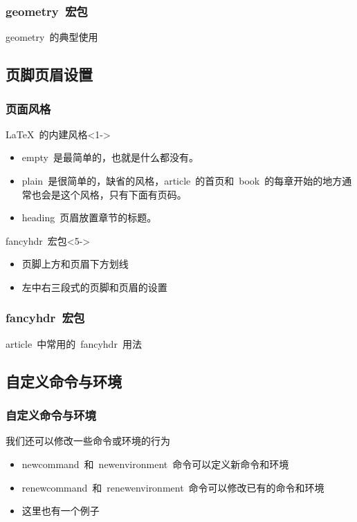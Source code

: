\begin{frame}
	\frametitle{geometry~宏包}
	\begin{block}{geometry~的典型使用}
		
	\end{block}
\end{frame}

\subsection{页脚页眉设置}

\begin{frame}
	\frametitle{页面风格}
	\begin{block}{\LaTeX~的内建风格}<1->
		\begin{itemize}
			\item<alert@2> \alert{empty}~是最简单的，也就是什么都没有。
			\item<alert@3> \alert{plain}~是很简单的，缺省的风格，article~的首页和~book~的每章开始的地方通常也会是这个风格，只有下面有页码。
			\item<alert@4> \alert{heading}~页眉放置章节的标题。
		\end{itemize}
	\end{block}
	\begin{block}{\alert{fancyhdr}~宏包}<5->
		\begin{itemize}
			\item 页脚上方和页眉下方划线
			\item 左中右三段式的页脚和页眉的设置
		\end{itemize}
	\end{block}
\end{frame}

\begin{frame}
	\frametitle{fancyhdr~宏包}
	\begin{block}{\alert{article}~中常用的~fancyhdr~用法}
		
	\end{block}
\end{frame}

\subsection{自定义命令与环境}
\begin{frame}
	\frametitle{自定义命令与环境}
	\begin{block}{我们还可以修改一些命令或环境的行为}
		\begin{itemize}
			\item newcommand~和~newenvironment~命令可以定义新命令和环境
			\item renewcommand~和~renewenvironment~命令可以修改已有的命令和环境
			\item<2-> 这里也有一个例子
				
		\end{itemize}
	\end{block}
\end{frame}

